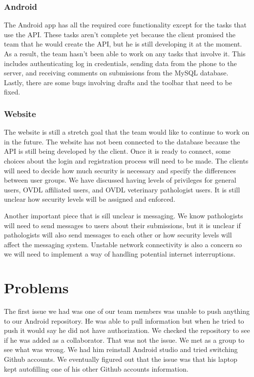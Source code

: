 \documentclass[onecolumn, draftclsnofoot,10pt, compsoc]{IEEEtran}
\begin{document}
\subsubsection{Android}
The Android app has all the required core functionality except for the tasks that use the API. These tasks aren't complete yet because the client promised the team that he would create the API, but he is still developing it at the moment. As a result, the team hasn't been able to work on any tasks that involve it. This includes authenticating log in credentials, sending 
data from the phone to the server, and receiving comments on submissions from the MySQL database. Lastly, there are some bugs involving drafts and the toolbar that need to be fixed.

\subsubsection{Website}
The website is still a stretch goal that the team would like to continue to work on in the future. The website has not been connected to the database because the API is still being developed by the client. Once it is ready to connect, some choices about the login and registration process will need to be made. The clients will need to decide how much security is necessary and specify the differences between user groups. We have discussed having levels of privileges for general users, OVDL affiliated users, and OVDL veterinary pathologist users. It is still unclear how security levels will be assigned and enforced. 

Another important piece that is sill unclear is messaging. We know pathologists will need to send messages to users about their submissions, but it is unclear if pathologists will also send messages to each other or how security levels will affect the messaging system. Unstable network connectivity is also a concern so we will need to implement a way of handling potential internet interruptions. 

\section{Problems}
The first issue we had was one of our team members was unable to push anything to our Android repository. He was able to pull information but when he tried to push it would say he did not have authorization. We checked the repository to see if he was added as a collaborator. That was not the issue. We met as a group to see what was wrong. We had him reinstall Android studio and tried switching Github accounts. We eventually figured out that the issue was that his laptop kept autofilling one of his other Github accounts information.
\end{document}
